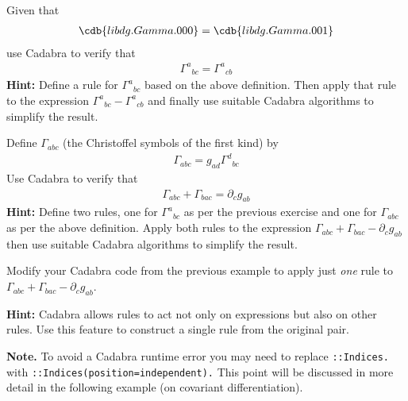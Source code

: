 \documentclass[a4paper,12pt]{article}
\numberwithin{equation}{section}%
\begin{document}

\begin{Exercises}

   \begin{Exercise}
      Given that
      \begin{align*}
         \cdb{libdg.Gamma.000} = \cdb{libdg.Gamma.001}
      \end{align*}
      use Cadabra to verify that
      \begin{align*}
         \Gamma^{a}{}_{bc} = \Gamma^{a}{}_{cb}
      \end{align*}
      {\bf Hint:} Define a rule for $\Gamma^{a}{}_{bc}$ based on the above definition.
      Then apply that rule to the expression $\Gamma^{a}{}_{bc} - \Gamma^{a}{}_{cb}$ and
      finally use suitable Cadabra algorithms to simplify the result.
   \end{Exercise}

   \begin{Exercise}
      Define $\Gamma_{abc}$ (the Christoffel symbols of the first kind) by
      \begin{align*}
         \Gamma_{abc} = g_{ad} \Gamma^{d}{}_{bc}
      \end{align*}
      Use Cadabra to verify that
      \begin{align*}
         \Gamma_{abc} + \Gamma_{bac} = \partial_{c} g_{ab}
      \end{align*}
      {\bf Hint:} Define two rules, one for $\Gamma^{a}{}_{bc}$ as per the previous exercise
      and one for $\Gamma_{abc}$ as per the above definition. Apply both rules to the
      expression $\Gamma_{abc} + \Gamma_{bac} - \partial_{c} g_{ab}$ then use suitable
      Cadabra algorithms to simplify the result.
   \end{Exercise}

   \begin{Exercise}
      Modify your Cadabra code from the previous example to apply just \emph{one} rule to
      $\Gamma_{abc} + \Gamma_{bac} - \partial_{c} g_{ab}$.

      {\bf Hint:} Cadabra allows rules to act not only on expressions but also on other
      rules. Use this feature to construct a single rule from the original pair.

      {\bf Note.} To avoid a Cadabra runtime error you may need to replace \verb|::Indices.|
      with \verb|::Indices(position=independent).| This point will be discussed in more
      detail in the following example (on covariant differentiation).
   \end{Exercise}


\end{Exercises}
\end{document}
